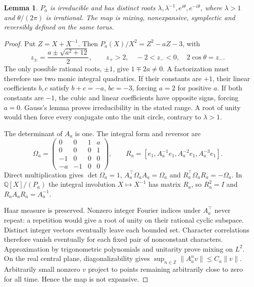 \documentclass[10pt]{article}
\newtheorem{lemma}{Lemma}
\begin{document}
\begin{lemma}
$P_a$ is irreducible and has distinct roots
$\lambda,\lambda^{-1},e^{i\theta},e^{-i\theta}$, where $\lambda>1$ and
$\theta/(2\pi)$ is irrational. The map is mixing, nonexpansive,
symplectic and reversibly defined on the same torus.
\end{lemma}
\begin{proof}
Put $Z=X+X^{-1}$. Then $P_a(X)/X^2=Z^2-aZ-3$, with
\[
 z_\pm=\frac{a\pm\sqrt{a^2+12}}2,\qquad
 z_+>2,\quad -2<z_-<0,\quad 2\cos\theta=z_-.
\]
The only possible rational roots, $\pm1$, give $1\mp2a\ne0$.
A factorization must therefore use two monic integral quadratics.
If their constants are $+1$, their linear coefficients $b,c$ satisfy
$b+c=-a$, $bc=-3$, forcing $a=2$ for positive $a$.
If both constants are $-1$, the cubic and linear coefficients have opposite
signs, forcing $a=0$. Gauss's lemma proves irreducibility in the stated range.
A root of unity would then force every conjugate onto the unit circle,
contrary to $\lambda>1$.

The determinant of $A_a$ is one. The integral form and reversor are
\[
 \Omega_a=\begin{pmatrix}0&0&1&a\\0&0&0&1\\-1&0&0&0\\-a&-1&0&0\end{pmatrix},
 \qquad R_a=[e_1,A_a^{-1}e_1,A_a^{-2}e_1,A_a^{-3}e_1].
\]
Direct multiplication gives $\det\Omega_a=1$,
$A_a^\top\Omega_aA_a=\Omega_a$ and $R_a^\top\Omega_aR_a=-\Omega_a$.
In $\mathbb Q[X]/(P_a)$ the integral involution $X\mapsto X^{-1}$
has matrix $R_a$, so $R_a^2=I$ and $R_aA_aR_a=A_a^{-1}$.

Haar measure is preserved. Nonzero integer Fourier indices under $A_a^\top$
never repeat: a repetition would give a root of unity on their rational
cyclic subspace. Distinct integer vectors eventually leave each bounded
set. Character correlations therefore vanish eventually for each fixed
pair of nonconstant characters. Approximation by trigonometric polynomials
and unitarity prove mixing on $L^2$.
On the real central plane, diagonalizability gives
$\sup_{n\in\mathbb Z}\|A_a^nv\|\le C_a\|v\|$.
Arbitrarily small nonzero $v$ project to points remaining arbitrarily
close to zero for all time. Hence the map is not expansive.
\end{proof}
\end{document}
